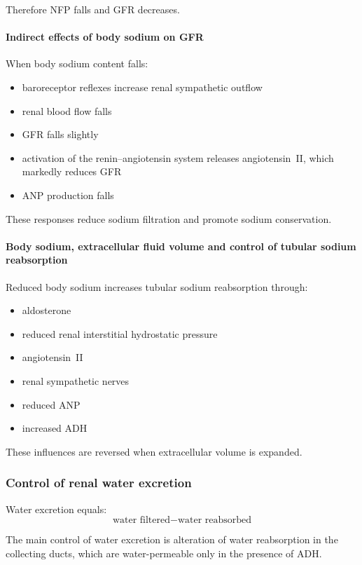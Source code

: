 \documentclass[11pt,a4paper]{article}
\begin{document}
Therefore NFP falls and GFR decreases.

\paragraph{Indirect effects of body sodium on GFR}

When body sodium content falls:
\begin{itemize}
    \item baroreceptor reflexes increase renal sympathetic outflow
    \item renal blood flow falls
    \item GFR falls slightly
    \item activation of the renin--angiotensin system releases angiotensin~II, which markedly reduces GFR
    \item ANP production falls
\end{itemize}

These responses reduce sodium filtration and promote sodium conservation.

\paragraph{Body sodium, extracellular fluid volume and control of tubular sodium reabsorption}

Reduced body sodium increases tubular sodium reabsorption through:
\begin{itemize}
    \item aldosterone
    \item reduced renal interstitial hydrostatic pressure
    \item angiotensin~II
    \item renal sympathetic nerves
    \item reduced ANP
    \item increased ADH
\end{itemize}

These influences are reversed when extracellular volume is expanded.

\subsubsection{Control of renal water excretion}

Water excretion equals:
\[
\text{water filtered} - \text{water reabsorbed}
\]

The main control of water excretion is alteration of water reabsorption in the collecting ducts, which are water-permeable only in the presence of ADH.
\end{document}
